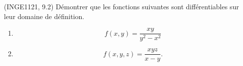 
\begin{exercice}\label{exoFoncDeuxVar0026}

	(INGE1121, 9.2) Démontrer que les fonctions suivantes sont différentiables sur leur domaine de définition.
	\begin{enumerate}

		\item
			\begin{equation}
				f(x,y)=\frac{ xy }{ y^2-x^2 }
			\end{equation}
		\item
			\begin{equation}
				f(x,y,z)=\frac{ xyz }{ x-y }.
			\end{equation}
	\end{enumerate}

\end{exercice}
